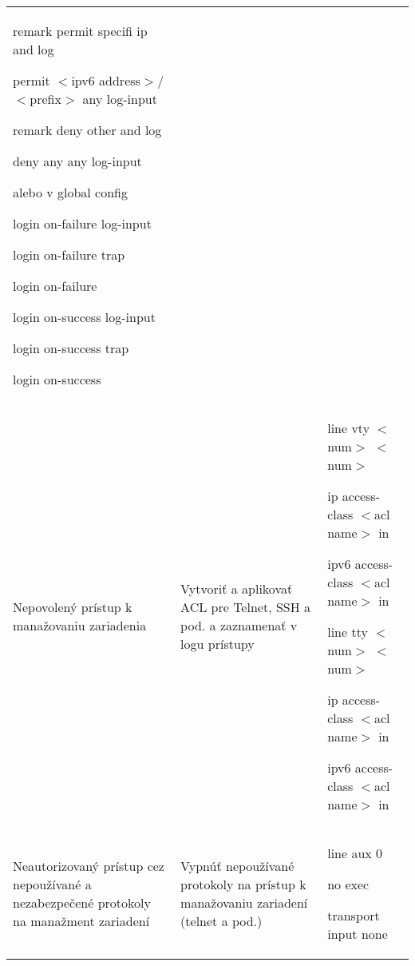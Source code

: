 \begin{longtable}[!htbp]{|L{10em}L{10em}>{\selectfont}L{34em}|}
	\hspace{0.5em}remark permit specifi ip and log
	
	\hspace{0.5em}permit $<$ipv6 address$>$/$<$prefix$>$ any log-input
	
	\hspace{0.5em}remark deny other and log
	
	\hspace{0.5em}deny any any log-input
	
	\vspace{0.5em}
	{\selectfont alebo v global config }
	\vspace{0.5em}
	
	login on-failure log-input
	
	login on-failure trap
	
	login on-failure
	
	login on-success log-input
	
	login on-success trap
	
	login on-success\\
	
	
	
	
	Nepovolený prístup k manažovaniu zariadenia	&Vytvoriť a aplikovať ACL pre Telnet, SSH a pod. a zaznamenať v logu prístupy	&line vty $<$num$>$ $<$num$>$
	
	\hspace{0.5em}ip access-class $<$acl name$>$ in
	
	\hspace{0.5em}ipv6 access-class $<$acl name$>$ in
	
	\vspace{0.5em}line tty $<$num$>$ $<$num$>$
	
	\hspace{0.5em}ip access-class $<$acl name$>$ in
	
	\hspace{0.5em}ipv6 access-class $<$acl name$>$ in\\
	
	
	
	
	
	Neautorizovaný prístup cez nepoužívané a nezabezpečené protokoly na manažment zariadení	&Vypnúť nepoužívané protokoly na prístup k manažovaniu zariadení (telnet a pod.)	&line aux 0
	
	\hspace{0.5em}no exec
	
	\hspace{0.5em}transport input none\\
	

\end{longtable}

